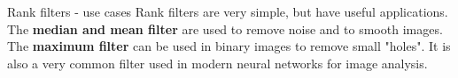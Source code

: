 \documentclass[9pt, aspectratio=169]{beamer}
\begin{document}
\begin{frame}
    {Rank filters - use cases}
    Rank filters are very simple, but have useful applications.\\

    The \textbf{median and mean filter} are used to remove noise and to smooth images.\\
    \pause
    \vspace{1em}
    The \textbf{maximum filter} can be used in binary images to remove  small "holes". It is also a very common filter used in modern neural networks for image analysis.\\

\end{frame}
\end{document}
